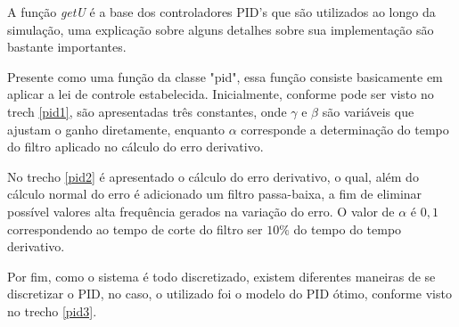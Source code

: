 A função \textit{getU} é a base dos controladores PID's que são utilizados ao longo da simulação, uma explicação sobre alguns detalhes sobre sua implementação são bastante importantes.

Presente como uma função da classe "pid", essa função consiste basicamente em aplicar a lei de controle estabelecida. Inicialmente, conforme pode ser visto no trech \ref{pid1}, são apresentadas três constantes, onde $\gamma$ e $\beta$ são variáveis que ajustam o ganho diretamente, enquanto $\alpha$ corresponde a determinação do tempo do filtro aplicado no cálculo do erro derivativo.




No trecho \ref{pid2} é apresentado o cálculo do erro derivativo, o qual, além do cálculo normal do erro é adicionado um filtro passa-baixa, a fim de eliminar possível valores alta frequência gerados na variação do erro. O valor de $\alpha$ é $0,1$ correspondendo ao tempo de corte do filtro ser $10\%$ do tempo do tempo derivativo.



Por fim, como o sistema é todo discretizado, existem diferentes maneiras de se discretizar o PID, no caso, o utilizado foi o modelo do PID ótimo, conforme visto no trecho \ref{pid3}.

